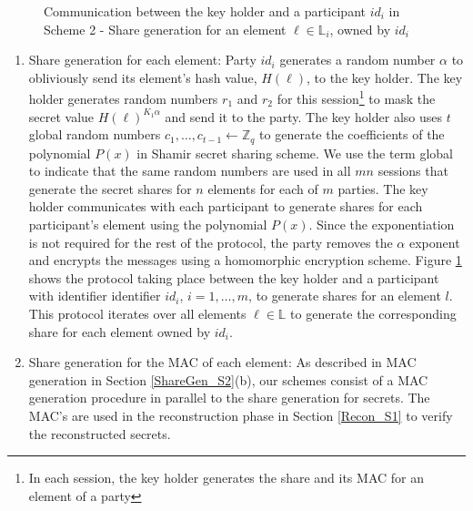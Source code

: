 \begin{figure}[h!]
   \caption{Communication between the key holder and a participant $id_i$ in Scheme 2 - Share generation for an element $\ell \in \mathbb{L}_i$, owned by $id_i$}
   \label{fig:S1_ShareGen}
\end{figure}
\begin{enumerate}[label=(\alph*)]
    \item Share generation for each element: Party $id_i$ generates a random number $\alpha$ to obliviously send its element's hash value, $H(\ell)$, to the key holder. The key holder generates random numbers $r_1$ and $r_2$ for this session\footnote{In each session, the key holder generates the share and its MAC for an element of a party} to mask the secret value $H(\ell)^{K_1 \alpha}$ and send it to the party. The key holder also uses $t$ global random numbers $c_1, \dots, c_{t-1} \gets \mathbb{Z}_q$ to generate the coefficients of the polynomial $P(x)$ in Shamir secret sharing scheme. We use the term global to indicate that the same random numbers are used in all $mn$ sessions that generate the secret shares for $n$ elements for each of $m$ parties. The key holder communicates with each participant to generate shares for each participant's element using the polynomial $P(x)$. Since the exponentiation is not required for the rest of the protocol, the party removes the $\alpha$ exponent and encrypts the messages using a homomorphic encryption scheme. Figure \ref{fig:S1_ShareGen} shows the protocol taking place between the key holder and a participant with identifier identifier $id_i$, $i =1, \dots, m$, to generate shares for an element $l$. This protocol iterates over all elements $\ell \in \mathbb{L}$ to generate the corresponding share for each element owned by $id_i$.
    \item Share generation for the MAC of each element: As described in MAC generation in Section \ref{ShareGen_S2}(b), our schemes consist of a MAC generation procedure in parallel to the share generation for secrets. The MAC's are used in the reconstruction phase in Section \ref{Recon_S1} to verify the reconstructed secrets. 
\end{enumerate}


